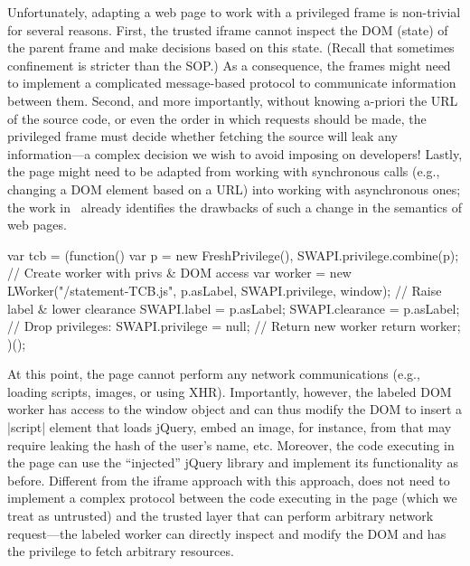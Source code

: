 Unfortunately, adapting a web page to work with a privileged frame 
is non-trivial for several reasons.
%
First, the trusted iframe cannot inspect the DOM (state) of the parent frame
and make decisions based on this state. 
%
(Recall that sometimes confinement is stricter than the SOP.)
%
As a consequence, the frames might need to implement a complicated
message-based protocol to communicate information between them.
%
Second, and more importantly, without knowing a-priori
the URL of the source code, or even the order in which requests should
be made, the privileged frame must decide whether fetching the source
will leak any information---a complex decision we wish to avoid
imposing on developers!  Lastly, the page might need to be adapted
from working with synchronous calls (e.g., changing a DOM element
based on a URL) into working with asynchronous ones; the work
in~\cite{Ingram:2012} already identifies the drawbacks of such a
change in the semantics of web pages.


%
%
%
%



\begin{jscode}
var tcb =
  (function() {
    var p = new FreshPrivilege(),
    SWAPI.privilege.combine(p);
    // Create worker with privs & DOM access
    var worker = new LWorker("/statement-TCB.js",
                             p.asLabel, SWAPI.privilege, window);
    // Raise label & lower clearance
    SWAPI.label = p.asLabel;
    SWAPI.clearance = p.asLabel;
    // Drop privileges:
    SWAPI.privilege = null;
    // Return new worker
    return worker;
  })();
\end{jscode}
%
%
At this point, the page cannot perform any network communications
(e.g., loading scripts, images, or using XHR).
%
Importantly, however, the labeled DOM worker has access to the window
object and can thus modify the DOM to insert a \js|script| element
that loads jQuery, embed an image, for instance, from
 that may require leaking the hash of the user's
name, etc.
%
Moreover, the code executing in the page can use the ``injected''
jQuery library and implement its functionality as before.
%
Different from the iframe approach with this approach, 
does not need to implement a complex protocol between the code
executing in the page (which we treat as untrusted) and the trusted
layer that can perform arbitrary network request---the labeled worker
can directly inspect and modify the DOM and has the privilege to fetch
arbitrary resources.

